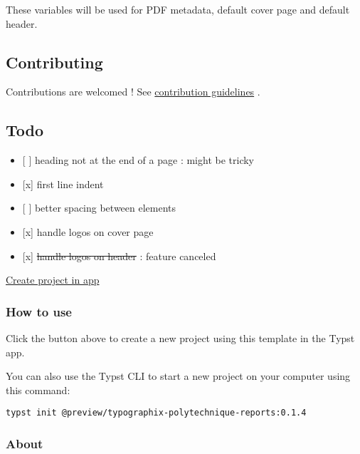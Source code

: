 These variables will be used for PDF metadata, default cover page and
default header.

\subsection{Contributing}\label{contributing}

Contributions are welcomed ! See
\href{https://github.com/typst/packages/raw/main/packages/preview/typographix-polytechnique-reports/0.1.4/CONTRIBUTING.md}{contribution
guidelines} .

\subsection{Todo}\label{todo}

\begin{itemize}
\tightlist
\item
  {[} {]} heading not at the end of a page : might be tricky
\item
  {[}x{]} first line indent
\item
  {[} {]} better spacing between elements
\item
  {[}x{]} handle logos on cover page
\item
  {[}x{]} \st{handle logos on header} : feature canceled
\end{itemize}

\href{/app?template=typographix-polytechnique-reports&version=0.1.4}{Create
project in app}

\subsubsection{How to use}\label{how-to-use}

Click the button above to create a new project using this template in
the Typst app.

You can also use the Typst CLI to start a new project on your computer
using this command:

\begin{verbatim}
typst init @preview/typographix-polytechnique-reports:0.1.4
\end{verbatim}



\subsubsection{About}\label{about}

